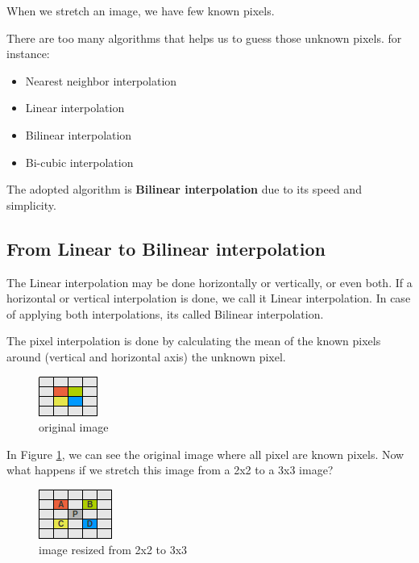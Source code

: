 \documentclass{article}
\begin{document}
	When we stretch an image, we have few known pixels.

	There are too many algorithms that helps us to guess those unknown pixels. for instance:

	\begin{itemize}
	  \item Nearest neighbor interpolation
	  \item Linear interpolation
	  \item Bilinear interpolation
	  \item Bi-cubic interpolation
	\end{itemize}

	The adopted algorithm is \textbf{Bilinear interpolation}  due to its speed and simplicity.
	
\subsection{From Linear to Bilinear interpolation}

	The Linear interpolation may be done horizontally or vertically, or even both. If a horizontal or vertical interpolation is done, we call it
	Linear interpolation. In case of applying both interpolations, its called Bilinear interpolation.	

	The pixel interpolation is done by calculating the mean of the known pixels around (vertical and horizontal axis) the unknown pixel. 

	\begin{figure} [H]
		\centering
		\includegraphics[scale=1]{images/bilinear_interpolation_1}
		\caption{original image \label{bilinear1}}
	\end{figure}

	In Figure \ref{bilinear1}, we can see the original image where all pixel are known pixels. Now what happens if we stretch this image 
	from a 2x2 to a 3x3 image?
	
	\begin{figure} [H]
		\centering
		\includegraphics[scale=1]{images/bilinear_interpolation_2}
		\caption{image resized from 2x2 to 3x3 \label{bilinear2}}
	\end{figure}
\end{document}
